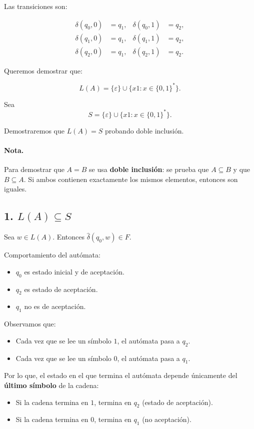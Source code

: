 \documentclass[12pt]{article}
\begin{document}
Las transiciones son:

\[
\begin{aligned}
\delta(q_0,0)&=q_1, & \delta(q_0,1)&=q_2, \\
\delta(q_1,0)&=q_1, & \delta(q_1,1)&=q_2, \\
\delta(q_2,0)&=q_1, & \delta(q_2,1)&=q_2.
\end{aligned}
\]

Queremos demostrar que:

\[
L(A)=\{\varepsilon\}\cup\{x1 : x\in\{0,1\}^*\}.
\]

Sea 
\[
S=\{\varepsilon\}\cup\{x1 : x\in\{0,1\}^*\}.
\]

Demostraremos que $L(A)=S$ probando doble inclusión.

\paragraph{Nota.}
Para demostrar que $A=B$ se usa \textbf{doble inclusión}: 
se prueba que $A\subseteq B$ y que $B\subseteq A$. 
Si ambos contienen exactamente los mismos elementos, entonces son iguales.


\newpage
\subsection*{1. $L(A)\subseteq S$}

Sea $w\in L(A)$. Entonces $\hat{\delta}(q_0,w)\in F$.

Comportamiento del autómata:

\begin{itemize}
\item $q_0$ es estado inicial y de aceptación.
\item $q_2$ es estado de aceptación.
\item $q_1$ no es de aceptación.
\end{itemize}

Observamos que:

\begin{itemize}
\item Cada vez que se lee un símbolo $1$, el autómata pasa a $q_2$.
\item Cada vez que se lee un símbolo $0$, el autómata pasa a $q_1$.
\end{itemize}

Por lo que, el estado en el que termina el autómata depende únicamente del \textbf{último símbolo} de la cadena:

\begin{itemize}
\item Si la cadena termina en $1$, termina en $q_2$ (estado de aceptación).
\item Si la cadena termina en $0$, termina en $q_1$ (no aceptación).
\end{itemize}
\end{document}
